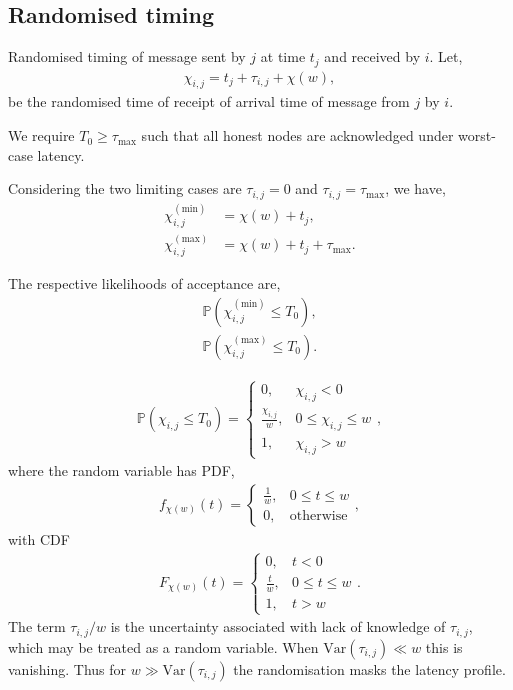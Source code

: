\subsection{Randomised timing}


Randomised timing of message sent by $j$ at time $t_j$ and received by $i$. Let,
\begin{align}
	\chi_{i,j} = t_j+\tau_{i,j}+\chi(w),
\end{align}
be the randomised time of receipt of arrival time of message from $j$ by $i$.

We require $T_0\geq\tau_\mathrm{max}$ such that all honest nodes are acknowledged under worst-case latency.

Considering the two limiting cases are $\tau_{i,j}=0$ and $\tau_{i,j}=\tau_\mathrm{max}$, we have,
\begin{align}
	\chi_{i,j}^{(\mathrm{min})} &= \chi(w) + t_j,\nonumber\\
	\chi_{i,j}^{(\mathrm{max})} &= \chi(w) + t_j + \tau_\mathrm{max}.
\end{align}

The respective likelihoods of acceptance are,
\begin{align}
	\mathbb{P}(\chi_{i,j}^{(\mathrm{min})} \leq T_0),\nonumber\\
	\mathbb{P}(\chi_{i,j}^{(\mathrm{max})} \leq T_0).
\end{align}


\begin{align}
	\mathbb{P}(\chi_{i,j} \leq T_0) = \begin{cases}
		0, &\chi_{i,j}<0\\
		\frac{\chi_{i,j}}{w}, &0\leq \chi_{i,j}\leq w\\
		1, &\chi_{i,j}>w
	\end{cases},
\end{align}
where the random variable has PDF,
\begin{align}
	f_{\chi(w)}(t) = \begin{cases}
		\frac{1}{w}, &0\leq t\leq w\\
		0, &\mathrm{otherwise}
	\end{cases},
\end{align}
with CDF
\begin{align}
	F_{\chi(w)}(t) = \begin{cases}
		0, &t<0\\
		\frac{t}{w}, &0\leq t\leq w\\
		1, &t>w
	\end{cases}.
\end{align}
The term \mbox{$\tau_{i,j}/w$} is the uncertainty associated with lack of knowledge of $\tau_{i,j}$, which may be treated as a random variable. When \mbox{$\mathrm{Var}(\tau_{i,j})\ll w$} this is vanishing. Thus for \mbox{$w\gg \mathrm{Var}(\tau_{i,j})$} the randomisation masks the latency profile.

